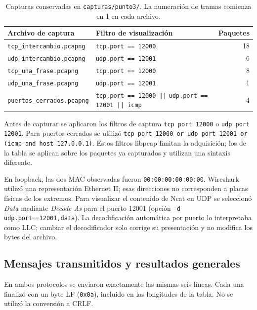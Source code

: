 \documentclass[12pt,a4paper]{article}
\begin{document}
\begin{table}[H]
\centering\small
\begin{tabular}{@{}p{5.1cm}p{6.6cm}r@{}}
\toprule
\textbf{Archivo de captura} & \textbf{Filtro de visualización} & \textbf{Paquetes} \\
\midrule
\texttt{tcp\_intercambio.pcapng} & \texttt{tcp.port == 12000} & 18 \\
\texttt{udp\_intercambio.pcapng} & \texttt{udp.port == 12001} & 6 \\
\texttt{tcp\_una\_frase.pcapng} & \texttt{tcp.port == 12000} & 8 \\
\texttt{udp\_una\_frase.pcapng} & \texttt{udp.port == 12001} & 1 \\
\texttt{puertos\_cerrados.pcapng} &
\texttt{tcp.port == 12000 ||}\newline
\texttt{udp.port == 12001 || icmp} & 4 \\
\bottomrule
\end{tabular}
\caption{Capturas conservadas en \texttt{capturas/punto3/}. La numeración de
tramas comienza en 1 en cada archivo.}
\label{tab:p3-capturas}
\end{table}

Antes de capturar se aplicaron los filtros de captura
\texttt{tcp port 12000} o \texttt{udp port 12001}. Para puertos cerrados
se utilizó \texttt{tcp port 12000 or udp port 12001 or (icmp and host 127.0.0.1)}.
Estos filtros libpcap limitan la adquisición; los de la tabla se aplican
sobre los paquetes ya capturados y utilizan una sintaxis diferente.

En loopback, las dos MAC observadas fueron \texttt{00:00:00:00:00:00}.
Wireshark utilizó una representación Ethernet II; esas direcciones no
corresponden a placas físicas de los extremos. Para visualizar el contenido de Ncat en UDP se
seleccionó \emph{Data} mediante \emph{Decode As} para el puerto 12001
(opción \texttt{-d} \texttt{udp.port==12001,data}). La decodificación automática por
puerto lo interpretaba como LLC; cambiar el decodificador solo corrige su
presentación y no modifica los bytes del archivo.

\subsection{Mensajes transmitidos y resultados generales}

En ambos protocolos se enviaron exactamente las mismas seis líneas.
Cada una finalizó con un byte LF (\texttt{0x0a}), incluido en las longitudes
de la tabla. No se utilizó la conversión a CRLF.
\end{document}
